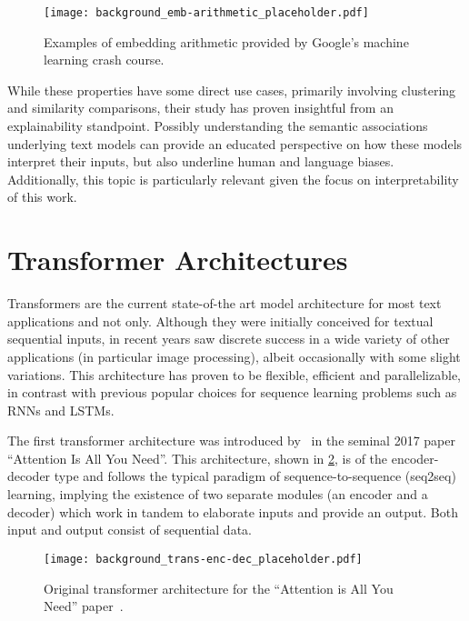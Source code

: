 \begin{figure}[t!]
    \centering
    \texttt{[image: background\_emb-arithmetic\_placeholder.pdf]}
    \caption[Examples of embedding arithmetic provided by Google's machine learning crash course]{Examples of embedding arithmetic provided by Google's machine learning crash course\footnotemark.}
    \label{fig:background_emb-arithmetic}
\end{figure}

While these properties have some direct use cases, primarily involving clustering and similarity comparisons, their study has proven insightful from an explainability standpoint.
Possibly understanding the semantic associations underlying text models can provide an educated perspective on how these models interpret their inputs, but also underline human and language biases.
Additionally, this topic is particularly relevant given the focus on interpretability of this work.

\section{Transformer Architectures}

Transformers are the current state-of-the art model architecture for most text applications and not only.
Although they were initially conceived for textual sequential inputs, in recent years saw discrete success in a wide variety of other applications (in particular image processing), albeit occasionally with some slight variations.
This architecture has proven to be flexible, efficient and parallelizable, in contrast with previous popular choices for sequence learning problems such as RNNs and LSTMs.

The first transformer architecture was introduced by~\citet{vaswani2017} in the seminal 2017 paper ``Attention Is All You Need''.
This architecture, shown in \cref{fig:background_trans-enc-dec}, is of the encoder-decoder type and follows the typical paradigm of sequence-to-sequence (seq2seq) learning, implying the existence of two separate modules (an encoder and a decoder) which work in tandem to elaborate inputs and provide an output.
Both input and output consist of sequential data.

\begin{figure}[t!]
    \centering
    \texttt{[image: background\_trans-enc-dec\_placeholder.pdf]}
    \caption{Original transformer architecture for the ``Attention is All You Need'' paper~\cite{vaswani2017}.}
    \label{fig:background_trans-enc-dec}
\end{figure}

